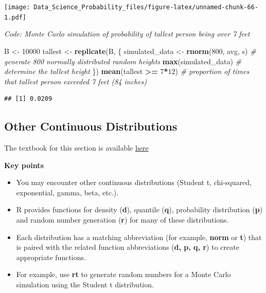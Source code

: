 \documentclass[
]{article}
\newenvironment{Shaded}{\begin{snugshade}}{\end{snugshade}}
\newcommand{\CommentTok}[1]{\textcolor[rgb]{0.56,0.35,0.01}{\textit{#1}}}
\newcommand{\DecValTok}[1]{\textcolor[rgb]{0.00,0.00,0.81}{#1}}
\newcommand{\KeywordTok}[1]{\textcolor[rgb]{0.13,0.29,0.53}{\textbf{#1}}}
\newcommand{\NormalTok}[1]{#1}
\newcommand{\OperatorTok}[1]{\textcolor[rgb]{0.81,0.36,0.00}{\textbf{#1}}}
\newcommand{\StringTok}[1]{\textcolor[rgb]{0.31,0.60,0.02}{#1}}
\providecommand{\tightlist}{%
  \setlength{\itemsep}{0pt}\setlength{\parskip}{0pt}}
\begin{document}
\texttt{[image: Data\_Science\_Probability\_files/figure-latex/unnamed-chunk-66-1.pdf]}

\emph{Code: Monte Carlo simulation of probability of tallest person
being over 7 feet}

\begin{Shaded}
\begin{Highlighting}[]
\NormalTok{B \textless{}{-}}\StringTok{ }\DecValTok{10000}
\NormalTok{tallest \textless{}{-}}\StringTok{ }\KeywordTok{replicate}\NormalTok{(B, \{}
\NormalTok{    simulated\_data \textless{}{-}}\StringTok{ }\KeywordTok{rnorm}\NormalTok{(}\DecValTok{800}\NormalTok{, avg, s)    }\CommentTok{\# generate 800 normally distributed random heights}
    \KeywordTok{max}\NormalTok{(simulated\_data)    }\CommentTok{\# determine the tallest height }
\NormalTok{\})}
\KeywordTok{mean}\NormalTok{(tallest }\OperatorTok{\textgreater{}=}\StringTok{ }\DecValTok{7}\OperatorTok{*}\DecValTok{12}\NormalTok{)    }\CommentTok{\# proportion of times that tallest person exceeded 7 feet (84 inches)}
\end{Highlighting}
\end{Shaded}

\begin{verbatim}
## [1] 0.0209
\end{verbatim}

\hypertarget{other-continuous-distributions}{%
\subsection{Other Continuous
Distributions}\label{other-continuous-distributions}}

The textbook for this section is available
\href{https://rafalab.github.io/dsbook/probability.html\#continuous-distributions}{here}

\textbf{Key points}

\begin{itemize}
\tightlist
\item
  You may encounter other continuous distributions (Student t,
  chi-squared, exponential, gamma, beta, etc.).
\item
  R provides functions for density (\textbf{d}), quantile (\textbf{q}),
  probability distribution (\textbf{p}) and random number generation
  (\textbf{r}) for many of these distributions.
\item
  Each distribution has a matching abbreviation (for example,
  \textbf{norm} or \textbf{t}) that is paired with the related function
  abbreviations (\textbf{d, p, q, r}) to create appropriate functions.
\item
  For example, use \textbf{rt} to generate random numbers for a Monte
  Carlo simulation using the Student t distribution.
\end{itemize}
\end{document}
